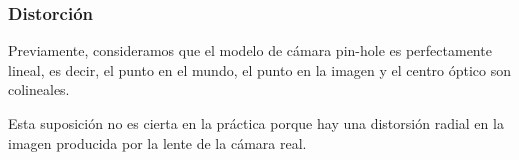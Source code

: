 \begin{frame}
	\frametitle{Distorción}
	
	\footnotesize
	
	Previamente, consideramos que el modelo de cámara pin-hole es perfectamente lineal, es decir, el punto en el mundo, el punto en la imagen y el centro óptico son colineales.
	
	Esta suposición no es cierta en la práctica porque hay una distorsión radial en la imagen producida por la lente de la cámara real.
	
	\begin{figure}[!h]
		\centering
	\end{figure}
	
\end{frame}


